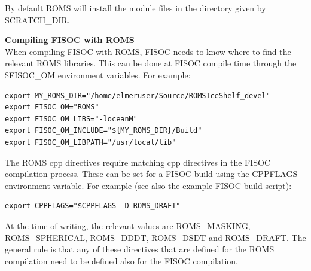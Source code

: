 \documentclass[12pt]{article}
\begin{document}
By default ROMS will install the module files in the directory given by 
 SCRATCH\_DIR.  

\vspace{10pt}
\textbf{Compiling FISOC with ROMS}\\
When compiling FISOC with ROMS, FISOC needs to know where to 
find the relevant ROMS libraries.  
This can be done at FISOC compile time through the 
\$FISOC\_OM
environment variables.  For example:

\begin{lstlisting}
export MY_ROMS_DIR="/home/elmeruser/Source/ROMSIceShelf_devel"
export FISOC_OM="ROMS"
export FISOC_OM_LIBS="-loceanM"
export FISOC_OM_INCLUDE="${MY_ROMS_DIR}/Build"
export FISOC_OM_LIBPATH="/usr/local/lib"
\end{lstlisting}

The ROMS cpp directives require matching cpp directives in the FISOC 
compilation process. 
These can be set for a FISOC build using the CPPFLAGS environment variable.
For example (see also the example FISOC build script):
\begin{lstlisting}
export CPPFLAGS="$CPPFLAGS -D ROMS_DRAFT"
\end{lstlisting}
At the time of writing, the relevant values are ROMS\_MASKING, ROMS\_SPHERICAL, 
ROMS\_DDDT, ROMS\_DSDT and ROMS\_DRAFT.  The general rule is that any of these directives that 
are defined for the ROMS compilation need to be defined also for the FISOC 
compilation. 







\end{document}
